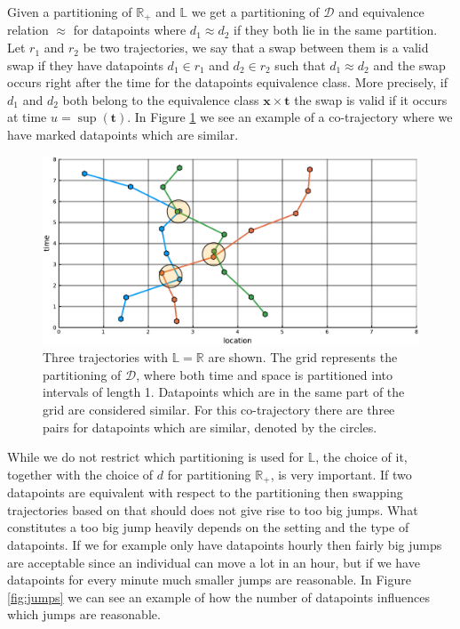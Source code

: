 \documentclass[12pt]{article}
\newcommand{\R}{\mathbb{R}}
\newcommand{\data}{d}
\newcommand{\swaptime}{u}
\newcommand{\locset}{\mathbb{L}}
\newcommand{\timeset}{\mathbb{R}_+}
\newcommand{\dataset}{\mathcal{D}}
\newcommand{\locint}{\mathbf{x}}
\newcommand{\timint}{\mathbf{t}}
\theoremstyle{definition}
\begin{document}
Given a partitioning of \(\timeset\) and \(\locset\) we get a
partitioning of \(\dataset\) and equivalence relation \(\approx\) for
datapoints where \(\data_{1} \approx \data_{2}\) if they both lie in
the same partition. Let \(r_{1}\) and \(r_{2}\) be two trajectories,
we say that a swap between them is a valid swap if they have
datapoints \(\data_{1} \in r_{1}\) and \(\data_{2} \in r_{2}\) such
that \(\data_{1} \approx \data_{2}\) and the swap occurs right after
the time for the datapoints equivalence class. More precisely, if
\(\data_{1}\) and \(\data_{2}\) both belong to the equivalence class
\(\locint \times \timint \) the swap is valid if it occurs at time
\(\swaptime = \sup(\timint)\). In Figure \ref{fig:similar} we see an
example of a co-trajectory where we have marked datapoints which are
similar.

\begin{figure}
  \centering
  \includegraphics[width=12cm]{similar.pdf}
  \caption{Three trajectories with \(\locset = \R\) are shown. The
    grid represents the partitioning of \(\dataset\), where both time
    and space is partitioned into intervals of length 1. Datapoints
    which are in the same part of the grid are considered similar. For
    this co-trajectory there are three pairs for datapoints which are
    similar, denoted by the circles.}
  \label{fig:similar}
\end{figure}

While we do not restrict which partitioning is used for \(\locset\),
the choice of it, together with the choice of \(d\) for partitioning
\(\timeset\), is very important. If two datapoints are equivalent with
respect to the partitioning then swapping trajectories based on that
should does not give rise to too big jumps. What constitutes a too big
jump heavily depends on the setting and the type of datapoints. If we
for example only have datapoints hourly then fairly big jumps are
acceptable since an individual can move a lot in an hour, but if we
have datapoints for every minute much smaller jumps are reasonable. In
Figure \ref{fig:jumps} we can see an example of how the number of
datapoints influences which jumps are reasonable.
\end{document}
